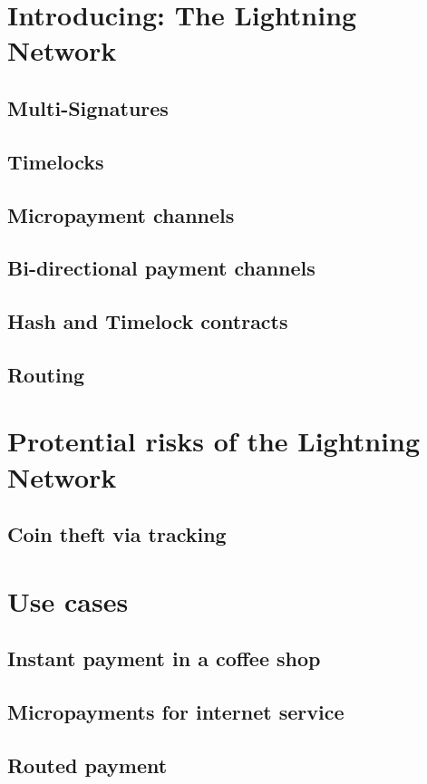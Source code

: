 \documentclass[a4paper, 12pt]{report}
\begin{document}
\chapter{Introducing: The Lightning Network}
\section{Multi-Signatures}
\section{Timelocks}
\section{Micropayment channels}
\section{Bi-directional payment channels}
\section{Hash and Timelock contracts}
\section{Routing}

\chapter{Protential risks of the Lightning Network}
\section{Coin theft via tracking}

\chapter{Use cases}
\section{Instant payment in a coffee shop}
\section{Micropayments for internet service}
\section{Routed payment}
\end{document}
